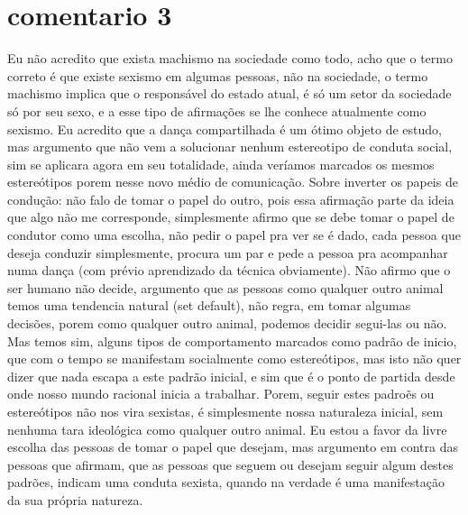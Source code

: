 \documentclass[a4paper,10pt]{article}
\begin{document}
\section{comentario 3}
\begin{comment}
 o brazilian zouk dance council nos puniu por fazermos condução compartilhada, essa organização não governamental serve? kkkkkk ai ai Enfim, pelo que entendi você acha que não existe machismo na dança de salão e que a condução compartilhada não serve para aquilo que ela se propõe a resolver. E então porque inventaram essa coisa, seria mimimi? Você também sugeriu que caso existisse machismo, a solução seria simplesmente a pessoa conduzida pedir para inverter os papeis de condução porque isso é bem fácil de acontecer. E mais uma vez você repetiu que acredita que o ser humano não decide sua própria cultura, é o instinto animal que forma tudo. Ou seja, você é a favor desses papéis de gênero e acha que são naturais. É isso, entendi corretamente?﻿
\end{comment}

\begin{comment}
Fiquei interessado no seu caso no congresso, gostaria souber que tipo de punição receberam, quanto tempo durou a punição, e qual foi o motivo que argumentaram para aplicar em vocês. 
\end{comment}
Eu não acredito que exista machismo na sociedade como todo, acho que o termo correto é que existe sexismo em algumas pessoas, não na sociedade, o termo machismo implica que o responsável do estado atual, é só um setor da sociedade só por seu sexo, e a esse tipo de afirmações se lhe conhece atualmente como sexismo. Eu acredito que a dança compartilhada é um ótimo objeto de estudo, mas argumento que não vem a solucionar nenhum estereotipo de conduta social, sim se aplicara agora em seu totalidade, ainda veríamos marcados os mesmos estereótipos porem nesse novo médio de comunicação. Sobre inverter os papeis de condução: não falo de tomar o papel do outro, pois essa afirmação parte da ideia que algo não me corresponde, simplesmente afirmo que se debe tomar o papel de condutor como uma escolha, não pedir o papel pra ver se é dado, cada pessoa que deseja conduzir simplesmente, procura um par e pede a pessoa pra acompanhar numa dança (com prévio aprendizado da técnica obviamente). Não afirmo que o ser humano não decide, argumento que as pessoas como qualquer outro animal temos uma tendencia natural (set default), não regra, em tomar algumas decisões, porem como qualquer outro animal, podemos decidir segui-las ou não. Mas temos sim, alguns tipos de comportamento marcados como padrão de inicio, que com o tempo se manifestam socialmente como estereótipos, mas isto não quer dizer que nada escapa a este padrão inicial, e sim que é o ponto de partida desde onde nosso mundo racional inicia a trabalhar. Porem, seguir estes padroẽs ou estereótipos não nos vira sexistas, é simplesmente nossa naturaleza inicial, sem nenhuma tara ideológica como qualquer outro animal. Eu estou a favor da livre escolha das pessoas de tomar o papel que desejam, mas argumento em contra das pessoas que afirmam, que as pessoas que seguem ou desejam seguir algum destes padrões, indicam uma conduta sexista, quando na verdade é uma manifestação da sua própria natureza.﻿
\end{document}
